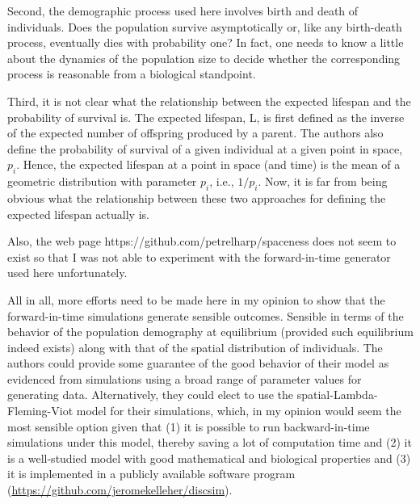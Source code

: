 Second, the demographic process used here involves birth and death of individuals. Does the population survive asymptotically or, like any birth-death process, eventually dies with probability one? In fact, one needs to know a little about the dynamics of the population size to decide whether the corresponding process is reasonable from a biological standpoint.
\begin{point}{}

\end{point}


\begin{point}{}
    Third, it is not clear what the relationship between the expected lifespan and the probability of survival is. The expected lifespan, L, is first defined as the inverse of the expected number of offspring produced by a parent. The authors also define the probability of survival of a given individual at a given point in space, $p_i$. Hence, the expected lifespan at a point in space (and time) is the mean of a geometric distribution with parameter $p_i$, i.e., $1/p_i$. Now, it is far from being obvious what the relationship between these two approaches for defining the expected lifespan actually is.
\end{point}


\begin{point}{}
    Also, the web page https://github.com/petrelharp/spaceness does not seem to exist so that I was not able to experiment with the forward-in-time generator used here unfortunately.
\end{point}


\begin{point}{}
    All in all, more efforts need to be made here in my opinion to show that the forward-in-time simulations generate sensible outcomes. Sensible in terms of the behavior of the population demography at equilibrium (provided such equilibrium indeed exists) along with that of the spatial distribution of individuals. The authors could provide some guarantee of the good behavior of their model as evidenced from simulations using a broad range of parameter values for generating data. Alternatively, they could elect to use the spatial-Lambda-Fleming-Viot model for their simulations, which, in my opinion would seem the most sensible option given that (1) it is possible to run backward-in-time simulations under this model, thereby saving a lot of computation time and (2) it is a well-studied model with good mathematical and biological properties and (3) it is implemented in a publicly available software program (\url{https://github.com/jeromekelleher/discsim}).
\end{point}

